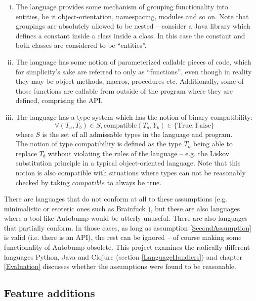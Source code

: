 \documentclass{l4proj}
\begin{document}
\begin{enumerate}[(i)]
\item The language provides some mechanism of grouping functionality
into entities, be it object-orientation, namespacing, modules and so
on. Note that groupings are absolutely allowed to be nested --
consider a Java library which defines a constant inside a class inside
a class. In this case the constant and both classes are considered to
be ``entities''.
\item The language has some notion of parameterized callable pieces of
code, which for simplicity's sake are referred to only as ``functions'',
even though in reality they may be object methods, macros, procedures etc.
Additionally, some of those functions are callable from outside of the
program where they are defined, comprising the API.
\label{SecondAssumption}
\item The language has a type system which has the notion of binary
compatibility:
\begin{equation}
\forall(T_a,T_b) \in S, \mathrm{compatible}(T_a,Y_b) \in \{\mathrm{True},\mathrm{False}\}
\end{equation}
where $S$ is the set of all admissable types in the language and
program. \\

The notion of type compatibility is defined as the type $T_a$ being able
to replace $T_b$ without violating the rules of the language -- e.g. the
Liskov substitution principle \cite{Liskov} in a typical
object-oriented language. Note that this notion is also compatible
with situations where types can not be reasonably checked by taking
$compatible$ to always be true.
\end{enumerate}

There are languages that do not conform at all to these assumptions
(e.g. minimalistic or esoteric ones such as Brainfuck
\cite{Brainfuck}), but these are also languages where a tool like
Autobump would be utterly unuseful. There are also languages that
partially conform. In those cases, as long as assumption
\ref{SecondAssumption} is valid (i.e. there is an API), the rest can
be ignored -- of course making some functionality of Autobump
obsolete. This project examines the radically different languages
Python, Java and Clojure (section \ref{LanguageHandlers}) and chapter
\ref{Evaluation} discusses whether the assumptions were found to be
reasonable.

\subsection{Feature additions}
\end{document}
